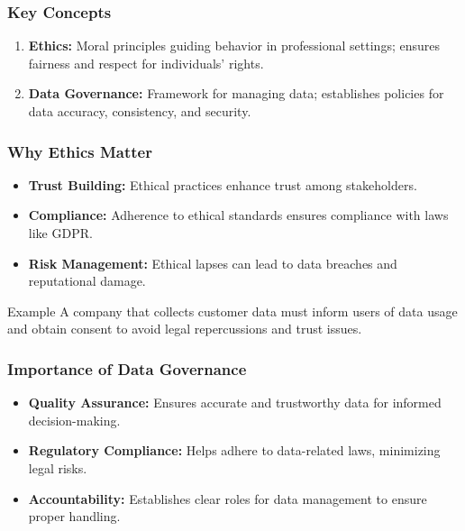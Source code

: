 \documentclass{beamer}
\begin{document}
\begin{frame}[fragile]
    \frametitle{Key Concepts}
    \begin{enumerate}
        \item \textbf{Ethics:} Moral principles guiding behavior in professional settings; ensures fairness and respect for individuals' rights.
        
        \item \textbf{Data Governance:} Framework for managing data; establishes policies for data accuracy, consistency, and security.
    \end{enumerate}
\end{frame}

\begin{frame}[fragile]
    \frametitle{Why Ethics Matter}
    \begin{itemize}
        \item \textbf{Trust Building:} Ethical practices enhance trust among stakeholders.
        
        \item \textbf{Compliance:} Adherence to ethical standards ensures compliance with laws like GDPR.
        
        \item \textbf{Risk Management:} Ethical lapses can lead to data breaches and reputational damage.
    \end{itemize}
    \begin{block}{Example}
        A company that collects customer data must inform users of data usage and obtain consent to avoid legal repercussions and trust issues.
    \end{block}
\end{frame}

\begin{frame}[fragile]
    \frametitle{Importance of Data Governance}
    \begin{itemize}
        \item \textbf{Quality Assurance:} Ensures accurate and trustworthy data for informed decision-making.
        
        \item \textbf{Regulatory Compliance:} Helps adhere to data-related laws, minimizing legal risks.
        
        \item \textbf{Accountability:} Establishes clear roles for data management to ensure proper handling.
    \end{itemize}
\end{frame}
\end{document}

